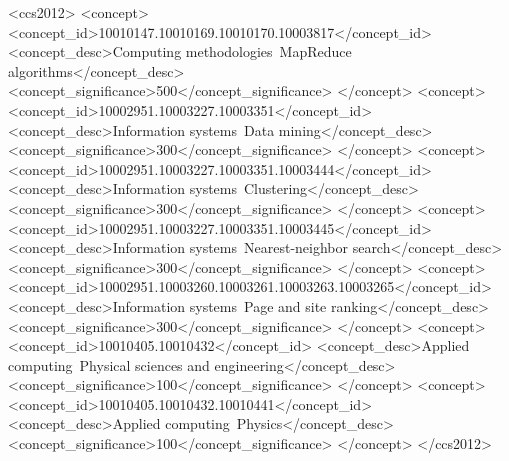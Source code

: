 \documentclass[sigconf]{acmart}
\begin{document}
%
\begin{CCSXML}
<ccs2012>
<concept>
<concept_id>10010147.10010169.10010170.10003817</concept_id>
<concept_desc>Computing methodologies~MapReduce algorithms</concept_desc>
<concept_significance>500</concept_significance>
</concept>
<concept>
<concept_id>10002951.10003227.10003351</concept_id>
<concept_desc>Information systems~Data mining</concept_desc>
<concept_significance>300</concept_significance>
</concept>
<concept>
<concept_id>10002951.10003227.10003351.10003444</concept_id>
<concept_desc>Information systems~Clustering</concept_desc>
<concept_significance>300</concept_significance>
</concept>
<concept>
<concept_id>10002951.10003227.10003351.10003445</concept_id>
<concept_desc>Information systems~Nearest-neighbor search</concept_desc>
<concept_significance>300</concept_significance>
</concept>
<concept>
<concept_id>10002951.10003260.10003261.10003263.10003265</concept_id>
<concept_desc>Information systems~Page and site ranking</concept_desc>
<concept_significance>300</concept_significance>
</concept>
<concept>
<concept_id>10010405.10010432</concept_id>
<concept_desc>Applied computing~Physical sciences and engineering</concept_desc>
<concept_significance>100</concept_significance>
</concept>
<concept>
<concept_id>10010405.10010432.10010441</concept_id>
<concept_desc>Applied computing~Physics</concept_desc>
<concept_significance>100</concept_significance>
</concept>
</ccs2012>
\end{CCSXML}


%

%
\end{document}

